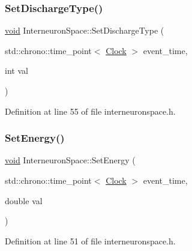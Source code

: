 \subsubsection{\texorpdfstring{Set\+Discharge\+Type()}{SetDischargeType()}}
{\footnotesize\ttfamily \mbox{\hyperlink{glad_8h_a950fc91edb4504f62f1c577bf4727c29}{void}} Interneuron\+Space\+::\+Set\+Discharge\+Type (\begin{DoxyParamCaption}\item[{std\+::chrono\+::time\+\_\+point$<$ \mbox{\hyperlink{universe_8h_a0ef8d951d1ca5ab3cfaf7ab4c7a6fd80}{Clock}} $>$}]{event\+\_\+time,  }\item[{int}]{val }\end{DoxyParamCaption})\hspace{0.3cm}{\ttfamily [inline]}}



Definition at line 55 of file interneuronspace.\+h.

\mbox{\label{class_interneuron_space_a65ecd1914ab039707313beb1b8702e68}} 
\subsubsection{\texorpdfstring{Set\+Energy()}{SetEnergy()}}
{\footnotesize\ttfamily \mbox{\hyperlink{glad_8h_a950fc91edb4504f62f1c577bf4727c29}{void}} Interneuron\+Space\+::\+Set\+Energy (\begin{DoxyParamCaption}\item[{std\+::chrono\+::time\+\_\+point$<$ \mbox{\hyperlink{universe_8h_a0ef8d951d1ca5ab3cfaf7ab4c7a6fd80}{Clock}} $>$}]{event\+\_\+time,  }\item[{double}]{val }\end{DoxyParamCaption})\hspace{0.3cm}{\ttfamily [inline]}}



Definition at line 51 of file interneuronspace.\+h.

\mbox{\label{class_interneuron_space_ab34d72ef9135288690328217d7c0a388}} 
